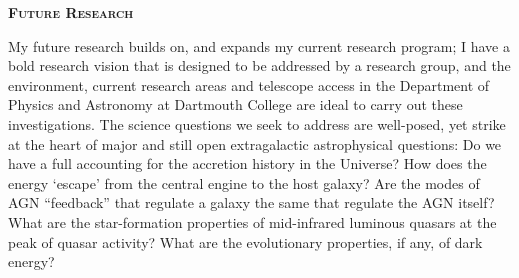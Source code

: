 \documentclass[oneside, a4paper, onecolumn, 11pt]{article}
\begin{document}
\medskip\medskip
\noindent
{\bfseries \large \textsc{\textcolor{Cerulean}{Future Research}}}

\smallskip
\smallskip
\noindent
My future research builds on, and expands my current research program;
I have a bold research vision that is designed to be addressed by a
research group, and the environment, current research areas and
telescope access in the Department of Physics and Astronomy at Dartmouth College
are ideal to
carry out these investigations.
The science questions we seek to address are well-posed, yet strike at
the heart of major and still open extragalactic astrophysical
questions: Do we have a full accounting for the accretion history in
the Universe?  How does the energy `escape' from the central engine to
the host galaxy?  Are the modes of AGN ``feedback'' that regulate a
galaxy the same that regulate the AGN itself?  What are the
star-formation properties of mid-infrared luminous quasars at the peak
of quasar activity?  What are the evolutionary properties, if any, of
dark energy?
\end{document}

